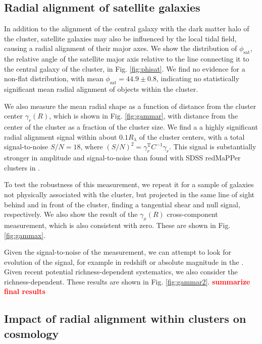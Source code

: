 \documentclass[fleqn,usenatbib]{mnras}
\newcommand{\verify}[1]{\textcolor{red}{\textbf{{#1}}}}
\begin{document}
\subsection{Radial alignment of satellite galaxies}\label{radial}

In addition to the alignment of the central galaxy with the dark matter halo of the cluster, satellite galaxies may also be influenced by the local tidal field, causing a radial alignment of their major axes. We show the distribution of $\phi_{\mathrm{sat}}$, the relative angle of the satellite major axis relative to the line connecting it to the central galaxy of the cluster, in Fig. \ref{fig:phisat}. We find no evidence for a non-flat distribution, with mean $\phi_{\mathrm{sat}}=44.9\pm 0.8$\textdegree, indicating no statistically significant mean radial alignment of objects within the cluster.

We also measure the mean radial shape as a function of distance from the cluster center $\gamma_r(R)$, which is shown in Fig. \ref{fig:gammar}, with distance from the center of the cluster as a fraction of the cluster size. We find a a highly significant radial alignment signal within about $0.1 R_{\lambda}$ of the cluster centers, with a total signal-to-noise $S/N=18$, where $(S/N)^2=\gamma_r^{\mathrm{T}} C^{-1} \gamma_r$. This signal is substantially stronger in amplitude and signal-to-noise than found with SDSS redMaPPer clusters in \cite{Huang_2016}.

To test the robustness of this measurement, we repeat it for a sample of galaxies not physically associated with the cluster, but projected in the same line of sight behind and in front of the cluster, finding a tangential shear and null signal, respectively. We also show the result of the $\gamma_x(R)$ cross-component measurement, which is also consistent with zero. These are shown in Fig. \ref{fig:gammax}. 

Given the signal-to-noise of the measurement, we can attempt to look for evolution of the signal, for example in redshift or absolute magnitude in the . Given recent potential richness-dependent systematics, we also consider the richness-dependent. These results are shown in Fig. \ref{fig:gammar2}. \verify{summarize final results}

\subsection{Impact of radial alignment within clusters on cosmology}
\end{document}
